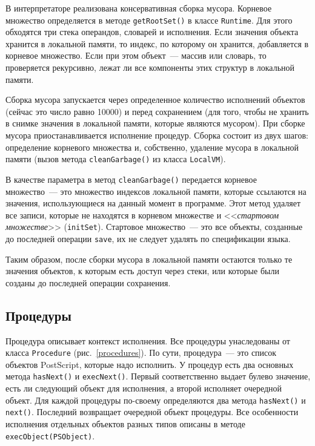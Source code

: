 В интерпретаторе реализована консервативная сборка мусора. Корневое множество определяется в методе \texttt{getRootSet()} в классе \texttt{Runtime}. Для этого обходятся три стека операндов, словарей и исполнения. Если значения объекта хранится в локальной памяти, то индекс, по которому он хранится, добавляется в корневое множество. Если при этом объект~--- массив или словарь, то проверяется рекурсивно, лежат ли все компоненты этих структур в локальной памяти.

Сборка мусора запускается через определенное количество исполнений объектов (сейчас это число равно 10000) и  перед сохранением (для того, чтобы не хранить в снимке значения в локальной памяти, которые являются мусором).  При сборке мусора приостанавливается исполнение процедур. Сборка состоит из двух шагов: определение корневого множества и, собственно, удаление мусора в локальной памяти (вызов метода \texttt{cleanGarbage()} из класса \texttt{LocalVM}).

В качестве параметра в метод \texttt{cleanGarbage()} передается корневое множество~--- это множество индексов локальной памяти, которые ссылаются на значения, использующиеся на данный момент в программе. Этот метод удаляет все записи, которые не находятся в корневом множестве и <<\textit{стартовом множестве}>> (\texttt{initSet}). Стартовое множество~--- это все объекты, созданные до последней операции \texttt{save}, их не следует удалять по спецификации языка. 

Таким образом, после сборки мусора в локальной памяти остаются только те значения объектов, к которым есть доступ через стеки, или которые были созданы до последней операции сохранения.

\subsection{Процедуры}
Процедура  описывает контекст исполнения. Все процедуры унаследованы  от  класса \texttt{Procedure} (рис.~\ref{procedures}). По сути, процедура~--- это список объектов PostScript, которые надо исполнить. У процедур есть два основных метода \texttt{hasNext()} и \texttt{execNext()}. Первый соответственно выдает булево значение, есть ли следующий объект для исполнения, а второй исполняет очередной объект. Для каждой процедуры по-своему определяются два метода \texttt{hasNext()} и \texttt{next()}. Последний возвращает очередной объект процедуры. Все особенности исполнения отдельных объектов разных типов описаны в методе \texttt{execObject(PSObject)}.

